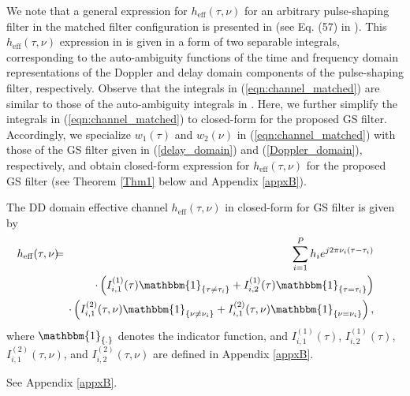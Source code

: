 \vspace{0mm}
We note that a general expression for $h_{\mathrm{eff}}(\tau,\nu)$ for an arbitrary pulse-shaping filter in the matched filter configuration is presented in \cite{zak_otfs5} (see Eq. (57) in \cite{zak_otfs5}). This $h_{\mathrm{eff}}(\tau,\nu)$ expression in \cite{zak_otfs5} is given in a form of two separable integrals, corresponding to the auto-ambiguity functions of the time and frequency domain representations of the Doppler and delay domain components of the pulse-shaping filter, respectively. Observe that the integrals in (\ref{eqn:channel_matched}) are similar to those of the auto-ambiguity integrals in \cite{zak_otfs5}. Here, we further simplify the integrals in (\ref{eqn:channel_matched}) to closed-form for the proposed GS filter. Accordingly, we specialize $w_1(\tau)$ and $w_2(\nu)$ in (\ref{eqn:channel_matched}) with those of the GS filter given in (\ref{delay_domain}) and (\ref{Doppler_domain}), respectively, and obtain closed-form expression for $h_{\mathrm{eff}}(\tau,\nu)$ for the proposed GS filter (see Theorem \ref{Thm1} below and Appendix \ref{appxB}).
\begin{theorem} 
The DD domain effective channel $h_{\mathrm{eff}}(\tau, \nu)$ in closed-form for GS filter is given by
\begin{eqnarray}
\hspace{-6mm}
h_{\mathrm{eff}}(\tau,\nu) & \hspace{-2mm} = & \hspace{-2mm} \sum_{i=1}^{P}h_{i}e^{j2\pi\nu_{i}(\tau-\tau_i)} \nonumber \\
& \hspace{-2mm} & \hspace{-2mm}
\cdot\left(I_{i,1}^{(1)}(\tau)\mathbbm{1}_{\{\tau\neq\tau_i\}}+I_{i,2}^{(1)}(\tau)\mathbbm{1}_{\{\tau=\tau_i\}}\right) \nonumber \\
& \hspace{-2mm} & \hspace{-2mm} \cdot \left(I_{i,1}^{(2)}(\tau,\nu)\mathbbm{1}_{\{\nu\neq\nu_i\}}+I_{i,1}^{(2)}(\tau,\nu)\mathbbm{1}_{\{\nu=\nu_i\}}\right),
\label{eqn:GS_match_channel}
\end{eqnarray}
where 
$\mathbbm{1}_{\{.\}}$ denotes the indicator function, and  
$I_{i,1}^{(1)}(\tau)$, $I_{i,2}^{(1)}(\tau)$, $I_{i,1}^{(2)}(\tau,\nu)$, and $I_{i,2}^{(2)}(\tau,\nu)$ are defined in Appendix \ref{appxB}. 
\label{Thm1}
\end{theorem}
\vspace{0mm}
\vspace{-1mm}
\begin{IEEEproof}
See Appendix \ref{appxB}.
\end{IEEEproof}

